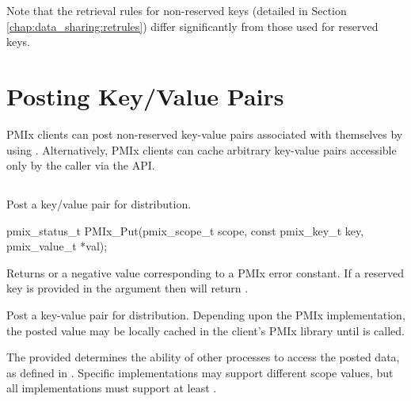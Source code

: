 Note that the retrieval rules for non-reserved keys (detailed in Section 
\ref{chap:data_sharing:retrules}) differ significantly from those used for reserved keys.


\section{Posting Key/Value Pairs}
\label{chap:data_sharing:set}

\ac{PMIx} clients can post non-reserved key-value pairs associated with themselves by using . Alternatively, \ac{PMIx} clients can cache arbitrary key-value pairs accessible only by the caller via the  \ac{API}.


\subsection{}

\summary

Post a key/value pair for distribution.

\format

\cspecificstart
\begin{codepar}
pmix_status_t
PMIx_Put(pmix_scope_t scope,
         const pmix_key_t key,
         pmix_value_t *val);
\end{codepar}
\cspecificend

\begin{arglist}
\end{arglist}

Returns  or a negative value corresponding to a \ac{PMIx} error constant.
If a reserved key is provided in the  argument then  will return .

\descr

Post a key-value pair for distribution. Depending upon the \ac{PMIx} implementation, the posted value may be locally cached in the client's \ac{PMIx} library until  is called.

The provided  determines the ability of other processes to access the posted data, as defined in .
Specific implementations may support different scope values, but all implementations must support at least .

